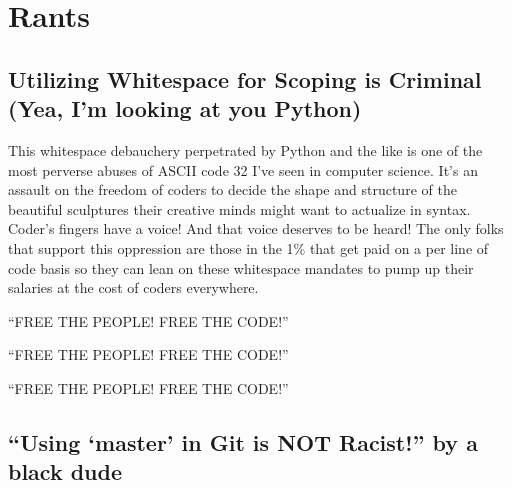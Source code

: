 \chapter{Rants}


\section{Utilizing Whitespace for Scoping is Criminal (Yea, I'm looking at you Python)}
\label{rant:whitespacesucks}
\par
This whitespace debauchery perpetrated by Python and the like is one of the most perverse abuses of ASCII code 32 I've seen in computer science. It's an assault on the freedom of coders to decide the shape and structure of the beautiful sculptures their creative minds might want to actualize in syntax. Coder's fingers have a voice! And that voice deserves to be heard! The only folks that support this oppression are those in the 1\% that get paid on a per line of code basis so they can lean on these whitespace mandates to pump up their salaries at the cost of coders everywhere.
\par
``FREE THE PEOPLE! FREE THE CODE!''
\par
``FREE THE PEOPLE! FREE THE CODE!''
\par
``FREE THE PEOPLE! FREE THE CODE!''

\section{``Using `master' in Git is NOT Racist!'' by a black dude}
\label{rant:racistmaster}
\par
[Insert Rant Here]